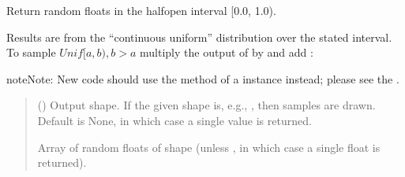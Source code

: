 \documentclass[letterpaper,10pt,english]{sphinxmanual}
\begin{document}
\begin{fulllineitems}
\label{\detokenize{metilda.controllers:metilda.controllers.pitch_art_wizard.random_sample}}
\pysigstartsignatures
{}
\pysigstopsignatures
\sphinxAtStartPar
Return random floats in the half\sphinxhyphen{}open interval {[}0.0, 1.0).

\sphinxAtStartPar
Results are from the “continuous uniform” distribution over the
stated interval.  To sample \(Unif[a, b), b > a\) multiply
the output of  by  and add :

\begin{sphinxVerbatim}[commandchars=\\\{\}]
      
\end{sphinxVerbatim}

\begin{sphinxadmonition}{note}{Note:}
\sphinxAtStartPar
New code should use the 
method of a  instance instead;
please see the .
\end{sphinxadmonition}
\begin{quote}\begin{description}
\sphinxAtStartPar
{} (\sphinxstyleliteralemphasis{\sphinxupquote{, }}) \textendash{} Output shape.  If the given shape is, e.g., , then
 samples are drawn.  Default is None, in which case a
single value is returned.

\sphinxAtStartPar
{} \textendash{} Array of random floats of shape  (unless , in which
case a single float is returned).


\end{description}
\end{quote}
\end{fulllineitems}
\end{document}
